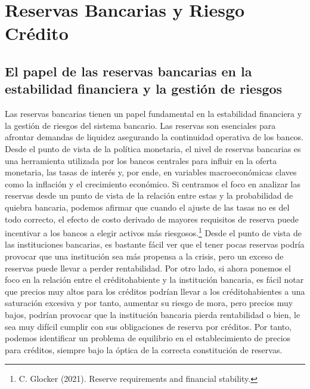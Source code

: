 \section{Reservas Bancarias y Riesgo Crédito}
\subsection{El papel de las reservas bancarias en la estabilidad financiera y la gestión de riesgos}
Las reservas bancarias tienen un papel fundamental en la estabilidad financiera y  la gestión de riesgos del sistema bancario. Las reservas son esenciales para afrontar demandas de liquidez asegurando la continuidad operativa de los bancos. Desde el punto de vista de la política monetaria, el nivel de reservas bancarias es una herramienta utilizada por los bancos centrales para influir en la oferta monetaria, las tasas de interés y, por ende, en variables macroeconómicas claves como la inflación y el crecimiento económico.
Si centramos el foco en analizar las reservas desde un punto de vista de la relación entre estas y la probabilidad de quiebra bancaria, podemos afirmar que cuando el ajuste de las tasas no es del todo correcto, el efecto de costo derivado de mayores requisitos de reserva puede incentivar a los bancos a elegir activos más riesgosos.\footnote{C. Glocker (2021). Reserve requirements and financial stability.} Desde el punto de vista de las instituciones bancarias, es bastante fácil ver que el tener pocas reservas podría provocar que una institución sea más propensa a la crisis, pero un exceso de reservas puede llevar a perder rentabilidad. Por otro lado, si ahora ponemos el foco en la relación entre el créditohabiente y la institución bancaria, es fácil notar que precios muy altos para los créditos podrían llevar a los créditohabientes a una saturación excesiva y por tanto, aumentar su riesgo de mora, pero precios muy bajos, podrían provocar que la institución bancaria pierda rentabilidad o bien, le sea muy difícil cumplir con sus obligaciones de reserva por créditos. Por tanto, podemos identificar un problema de equilibrio en el establecimiento de precios para créditos, siempre bajo la óptica de la correcta constitución de reservas. 


